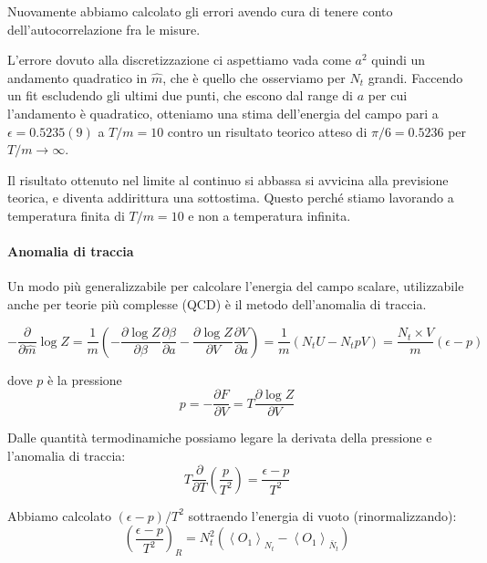 \documentclass[a4paper, 12pt]{article}
\begin{document}
Nuovamente abbiamo calcolato gli errori avendo cura di tenere conto
dell'autocorrelazione fra le misure.

L'errore dovuto alla discretizzazione ci aspettiamo vada come $a^2$ quindi
un andamento quadratico in $\hat{m}$, che è quello che osserviamo per $N_t$ grandi.
Faccendo un fit escludendo gli ultimi due punti, che escono dal range di $a$
per cui l'andamento è quadratico, otteniamo una stima dell'energia del campo
pari a $\epsilon = 0.5235(9)$ a $T/m = 10$ contro un risultato teorico atteso
di $\pi / 6 = 0.5236$ per $T/m \rightarrow \infty$.

Il risultato ottenuto nel limite al continuo si abbassa si avvicina alla
previsione teorica, e diventa addirittura una sottostima. Questo perché
stiamo lavorando a temperatura finita di $T/m=10$ e non a temperatura infinita.

\paragraph{Anomalia di traccia}
Un modo più generalizzabile per calcolare l'energia del campo scalare,
utilizzabile anche per teorie più complesse (QCD) è il metodo dell'anomalia
di traccia.

\begin{equation}
- \frac{\partial}{\partial \hat{m}} \log Z
= \frac{1}{m} \left( -\frac{\partial \log Z}{\partial \beta}
    \frac{\partial \beta}{\partial a} -\frac{\partial \log Z}{\partial V}
    \frac{\partial V}{\partial a}\right)
= \frac{1}{m}(N_tU-N_tpV)
= \frac{N_t \times V}{m} (\epsilon - p)
\end{equation}

dove $p$ è la pressione
\begin{equation}
p=-\frac{\partial F}{\partial V} = T \frac{\partial \log Z}{\partial V}
\end{equation}

Dalle quantità termodinamiche possiamo legare la derivata della pressione
e l'anomalia di traccia:
\begin{equation}
T \frac{\partial}{\partial T} \left( \frac{p}{T^2} \right) = \frac{\epsilon - p}{T^2}
\label{anomalia_traccia}
\end{equation}

Abbiamo calcolato $(\epsilon - p) / T^2$ sottraendo l'energia di vuoto (rinormalizzando):
\begin{equation}
\left( \frac{\epsilon - p}{T^2} \right)_R = N_t^2(\left<O_1 \right>_{N_t}
- \left<O_1 \right>_{\bar{N}_t})
\end{equation}
\end{document}
